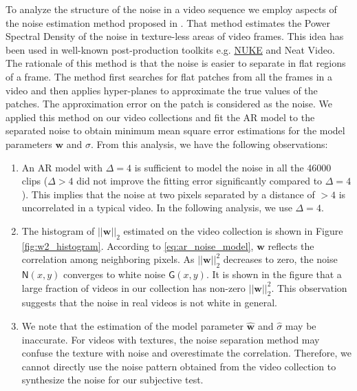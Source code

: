 \documentclass{sig-alternate}
\newcommand{\vect}[1]{\boldsymbol{#1}} %
\begin{document}
To analyze the structure of the noise in a video sequence we employ aspects of the noise estimation method proposed in \cite{KokKelDenCra2016}. That method estimates the Power Spectral Density of the noise in texture-less areas of video frames. This idea has been used in well-known post-production toolkits e.g. \href{http://www.thefoundry.co.uk}{NUKE} and Neat Video. The rationale of this method is that the noise is easier to separate in flat regions of a frame. The method first searches for flat patches from all the frames in a video and then applies hyper-planes to approximate the true values of the patches. The approximation error on the patch is considered as the noise. We applied this method on our video collections and fit the AR model to the separated noise to obtain minimum mean square error estimations for the model parameters $\vect{w}$ and $\sigma$. From this analysis, we have the following observations:
\begin{enumerate}[leftmargin=*]
\item An AR model with $\Delta=4$ is sufficient to model the noise in all the 46000 clips ($\Delta>4$ did not improve the fitting error significantly compared to $\Delta=4$). This implies that the noise at two pixels separated by a distance of $>4$ is uncorrelated in a typical video. In the following analysis, we use $\Delta=4$.
\item The histogram of $||\vect{w}||_2$ estimated on the video collection is shown in Figure \ref{fig:w2_histogram}. According to \eqref{eq:ar_noise_model}, $\vect{w}$ reflects the correlation among neighboring pixels. As $||\vect{w}||_2^2$ decreases to zero, the noise $\mathsf{N}(x,y)$ converges to white noise $\mathsf{G}(x,y)$. It is shown in the figure that a large fraction of videos in our collection has non-zero $||\vect{w}||_2^2$. This observation suggests that the noise in real videos is not white in general.
\item We note that the estimation of the model parameter $\vect{\hat w}$ and $\hat\sigma$ may be inaccurate. For videos with textures, the noise separation method may confuse the texture with noise and overestimate the correlation. Therefore, we cannot directly use the noise pattern obtained from the video collection to synthesize the noise for our subjective test.  
\end{enumerate}
\end{document}
